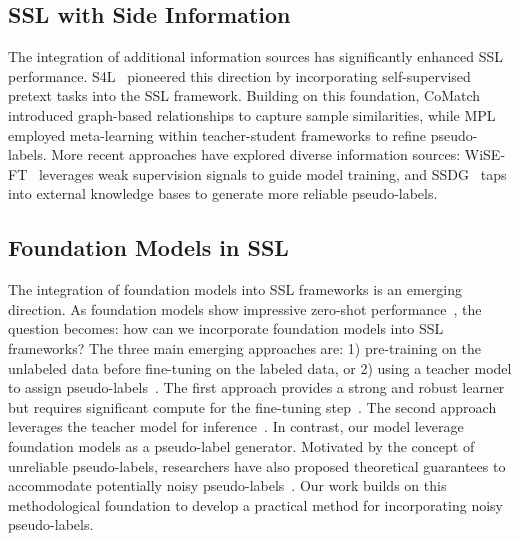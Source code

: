 \subsection{SSL with Side Information}

The integration of additional information sources has significantly enhanced SSL performance. S4L~\cite{zhai2019s4l} pioneered this direction by incorporating self-supervised pretext tasks into the SSL framework. Building on this foundation, CoMatch~\cite{li2021comatch} introduced graph-based relationships to capture sample similarities, while MPL~\cite{pham2021meta} employed meta-learning within teacher-student frameworks to refine pseudo-labels. More recent approaches have explored diverse information sources: WiSE-FT~\cite{wortsman2022robust} leverages weak supervision signals to guide model training, and SSDG~\cite{wang2023better} taps into external knowledge bases to generate more reliable pseudo-labels. 


\subsection{Foundation Models in SSL}
The integration of foundation models into SSL frameworks is an emerging direction. As foundation models show impressive zero-shot performance~\cite{liangholistic, lehman2023we}, the question becomes: how can we incorporate foundation models into SSL frameworks? The three main emerging approaches are: 1) pre-training on the unlabeled data before fine-tuning on the labeled data, or 2) using a teacher model to assign pseudo-labels~\cite{shi2023rethinking}. The first approach provides a strong and robust learner but requires significant compute for the fine-tuning step~\cite{ganerasing,you2024diffusion,hegselmann2023tabllm}. The second approach leverages the teacher model for inference~\cite{chen2020big,yang2024knowledge}. In contrast, our model leverage foundation models as a pseudo-label generator. Motivated by the concept of unreliable pseudo-labels, researchers have also proposed theoretical guarantees to accommodate potentially noisy pseudo-labels~\cite{zhu2024doubly}. Our work builds on this methodological foundation to develop a practical method for incorporating noisy pseudo-labels.

